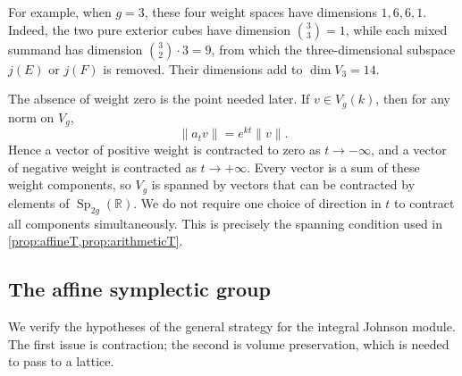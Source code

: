 \documentclass[11pt,a4paper]{article}
\theoremstyle{definition}
\newcommand{\R}{\mathbb R}
\newcommand{\Sp}{\operatorname{Sp}}
\begin{document}
For example, when \(g=3\), these four weight spaces have
dimensions \(1,6,6,1\). Indeed, the two pure exterior cubes
have dimension \(\binom33=1\), while each mixed summand
has dimension \(\binom32\cdot3=9\), from which the
three-dimensional subspace \(j(E)\) or \(j(F)\) is removed.
Their dimensions add to \(\dim V_3=14\).

The absence of weight zero is the point needed later.
If \(v\in V_g(k)\), then for any norm on \(V_g\),
\[
 \|a_t v\|=e^{kt}\|v\|.
\]
Hence a vector of positive weight is contracted to zero as
\(t\to-\infty\), and a vector of negative weight is contracted
as \(t\to+\infty\). Every vector is a sum of these weight
components, so \(V_g\) is spanned by vectors that can be
contracted by elements of \(\Sp_{2g}(\R)\). We do not require
one choice of direction in \(t\) to contract all components
simultaneously. This is precisely the spanning condition used
in \cref{prop:affineT,prop:arithmeticT}.

\subsection{The affine symplectic group}
\label{sec:affine}

We verify the hypotheses of the general strategy for the integral
Johnson module. The first issue is contraction; the second is
volume preservation, which is needed to pass to a lattice.
\end{document}
